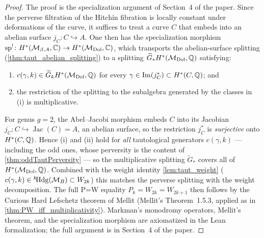 \begin{proof}
  The proof is the specialization argument of Section~4 of the paper.  Since
  the perverse filtration of the Hitchin fibration is locally constant under
  deformations of the curve, it suffices to treat a curve \(C\) that embeds
  into an abelian surface \(j_C \colon C \hookrightarrow A\).  One then has
  the specialization morphism
  \(\mathrm{sp}^! \colon H^*(\mathcal{M}_{\beta,A},\mathbb{C}) \to
  H^*(\mathcal{M}_{\mathrm{Dol}},\mathbb{C})\), which transports the abelian-surface splitting
  (\cref{thm:taut_abelian_splitting}) to a splitting
  \(\widetilde{G}_* H^*(\mathcal{M}_{\mathrm{Dol}},\mathbb{Q})\) satisfying:
  \begin{enumerate}
    \item[(i)] \(c(\gamma,k) \in \widetilde{G}_k H^*(\mathcal{M}_{\mathrm{Dol}},\mathbb{Q})\) for every
      \(\gamma \in \operatorname{Im}(j_C^*) \subset H^*(C,\mathbb{Q})\); and
    \item[(ii)] the restriction of the splitting to the subalgebra generated
      by the classes in (i) is multiplicative.
  \end{enumerate}
  For genus \(g = 2\), the Abel--Jacobi morphism embeds \(C\) into its
  Jacobian \(j_C \colon C \hookrightarrow \operatorname{Jac}(C) = A\), an
  abelian surface, so the restriction \(j_C^*\) is \emph{surjective} onto
  \(H^*(C,\mathbb{Q})\).  Hence (i) and (ii) hold for \emph{all} tautological
  generators \(c(\gamma,k)\) --- including the odd ones, whose perversity is
  the content of \cref{thm:oddTautPerversity} --- so the multiplicative
  splitting \(\widetilde{G}_*\) covers all of \(H^*(\mathcal{M}_{\mathrm{Dol}},\mathbb{Q})\).  Combined
  with the weight identity \cref{lem:taut_weight}
  (\(c(\gamma,k) \in {}^k\!\mathrm{Hdg}(\mathcal{M}_B) \subset W_{2k}\)) this matches
  the perverse splitting with the weight decomposition.  The full P=W
  equality \(P_k = W_{2k} = W_{2k+1}\) then follows by the Curious Hard
  Lefschetz theorem of Mellit (Mellit's Theorem~1.5.3, applied as in
  \cref{thm:PW_iff_multiplicativity}).  Markman's monodromy operators,
  Mellit's theorem, and the specialization morphism are axiomatized in the
  Lean formalization; the full argument is in Section~4 of the paper.
\end{proof}

